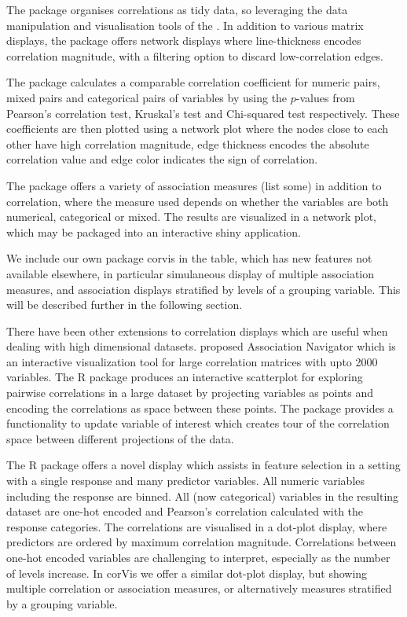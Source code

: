 The package  \citep{corrr2020} organises correlations as
tidy data, so leveraging the data manipulation and visualisation tools
of the  \citep{tidyverse}. In addition to various
matrix displays, the package offers network displays where
line-thickness encodes correlation magnitude, with a filtering option to
discard low-correlation edges.

The package  \citep{corrgrapher} calculates a
comparable correlation coefficient for numeric pairs, mixed pairs and
categorical pairs of variables by using the \(p\)-values from Pearson's
correlation test, Kruskal's test and Chi-squared test respectively.
These coefficients are then plotted using a network plot where the nodes
close to each other have high correlation magnitude, edge thickness
encodes the absolute correlation value and edge color indicates the sign
of correlation.

The package  \citep{linkspotter} offers a variety
of association measures (list some) in addition to correlation, where
the measure used depends on whether the variables are both numerical,
categorical or mixed. The results are visualized in a network plot,
which may be packaged into an interactive shiny application.

We include our own package corvis in the table, which has new features
not available elsewhere, in particular simulaneous display of multiple
association measures, and association displays stratified by levels of a
grouping variable. This will be described further in the following
section.

There have been other extensions to correlation displays which are
useful when dealing with high dimensional datasets.
\citet{buja2016visualization} proposed Association Navigator which is an
interactive visualization tool for large correlation matrices with upto
2000 variables. The R package  \citep{scorr} produces
an interactive scatterplot for exploring pairwise correlations in a
large dataset by projecting variables as points and encoding the
correlations as space between these points. The package provides a
functionality to update variable of interest which creates tour of the
correlation space between different projections of the data.

The R package  offers a novel display which
assists in feature selection in a setting with a single response and
many predictor variables. All numeric variables including the response
are binned. All (now categorical) variables in the resulting dataset are
one-hot encoded and Pearson's correlation calculated with the response
categories. The correlations are visualised in a dot-plot display, where
predictors are ordered by maximum correlation magnitude. Correlations
between one-hot encoded variables are challenging to interpret,
especially as the number of levels increase. In corVis we offer a
similar dot-plot display, but showing multiple correlation or
association measures, or alternatively measures stratified by a grouping
variable.

